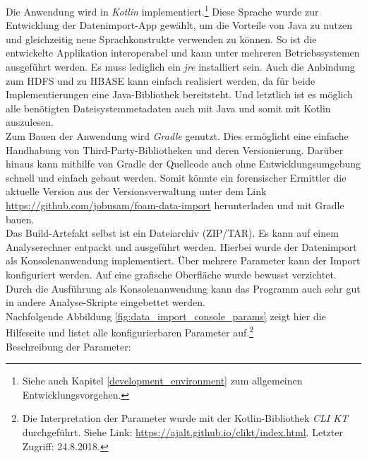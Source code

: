 \noindent
Die Anwendung wird in \textit{Kotlin} implementiert.\footnote{Siehe auch Kapitel \ref{development_environment} zum allgemeinen Entwicklungsvorgehen.} Diese Sprache wurde zur Entwicklung der Datenimport-App gewählt, um die Vorteile von Java zu nutzen und gleichzeitig neue Sprachkonstrukte verwenden zu können. So ist die entwickelte Applikation interoperabel und kann unter mehreren Betriebssystemen ausgeführt werden. Es muss lediglich ein \textit{\gls{jre}}  installiert sein. Auch die Anbindung zum HDFS und zu HBASE kann einfach realisiert werden, da für beide Implementierungen eine Java-Bibliothek bereitsteht. Und letztlich ist es möglich alle benötigten Dateisystemmetadaten auch mit Java und somit mit Kotlin auszulesen. \\
Zum Bauen der Anwendung wird \textit{Gradle} genutzt. Dies ermöglicht eine einfache Handhabung von Third-Party-Bibliotheken und deren Versionierung. Darüber hinaus kann mithilfe von Gradle der Quellcode auch ohne Entwicklungsumgebung schnell und einfach gebaut werden. Somit könnte ein forensischer Ermittler die aktuelle Version aus der Versionsverwaltung unter dem Link \url{https://github.com/jobusam/foam-data-import} herunterladen und mit Gradle bauen.\\
Das Build-Artefakt selbst ist ein Dateiarchiv (ZIP/TAR). Es kann auf einem Analyserechner entpackt und ausgeführt werden. Hierbei wurde der Datenimport als Konsolenanwendung implementiert. Über mehrere Parameter kann der Import konfiguriert werden. Auf eine grafische Oberfläche wurde bewusst verzichtet. Durch die Ausführung als Konsolenanwendung kann das Programm auch sehr gut in andere Analyse-Skripte eingebettet werden.\\

\noindent
Nachfolgende Abbildung \ref{fig:data_import_console_params}  zeigt hier die Hilfeseite und listet alle konfigurierbaren Parameter auf.\footnote{Die Interpretation der Parameter wurde mit der Kotlin-Bibliothek \textit{CLI KT} durchgeführt. Siehe Link: \url{https://ajalt.github.io/clikt/index.html}. Letzter Zugriff: 24.8.2018.}\\
Beschreibung der Parameter:


